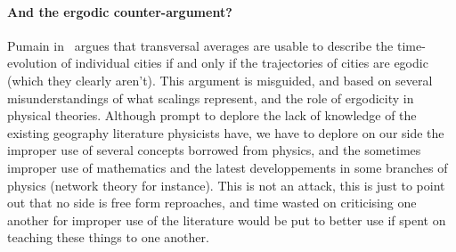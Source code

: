 \paragraph{And the ergodic counter-argument?} Pumain in~\cite{Pumain:2012} argues that
transversal averages are usable to describe the time-evolution of individual
cities if and only if the trajectories of cities are egodic (which they clearly
aren't). This argument is misguided, and based on several misunderstandings of
what scalings represent, and the role of ergodicity in physical theories.
Although prompt to deplore the lack of knowledge of the existing geography
literature physicists have, we have to deplore on our side the improper use of
several concepts borrowed from physics, and the sometimes improper use of
mathematics and the latest developpements in some branches of physics (network
theory for instance). This is not an attack, this is just to point out that no
side is free form reproaches, and time wasted on criticising one another for
improper use of the literature would be put to better use if spent on teaching
these things to one another.

